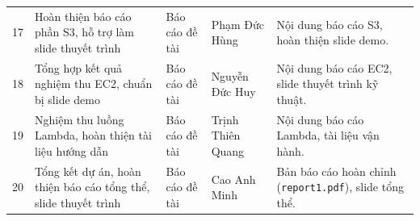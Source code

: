 \documentclass[a4paper,12pt]{article}
\begin{document}
\begin{longtable}{@{}p{0.6cm}>{\raggedright\arraybackslash}p{3.8cm}>{\raggedright\arraybackslash}p{3.2cm}>{\raggedright\arraybackslash}p{2.6cm}>{\raggedright\arraybackslash}p{4.8cm}@{}}
17 & Hoàn thiện báo cáo phần S3, hỗ trợ làm slide thuyết trình & Báo cáo đề tài & Phạm Đức Hùng & Nội dung báo cáo S3, hoàn thiện slide demo.\\
18 & Tổng hợp kết quả nghiệm thu EC2, chuẩn bị slide demo & Báo cáo đề tài & Nguyễn Đức Huy & Nội dung báo cáo EC2, slide thuyết trình kỹ thuật.\\
19 & Nghiệm thu luồng Lambda, hoàn thiện tài liệu hướng dẫn & Báo cáo đề tài & Trịnh Thiên Quang & Nội dung báo cáo Lambda, tài liệu vận hành.\\
20 & Tổng kết dự án, hoàn thiện báo cáo tổng thể, slide thuyết trình & Báo cáo đề tài & Cao Anh Minh & Bản báo cáo hoàn chỉnh (\texttt{report1.pdf}), slide tổng thể.\\
\end{longtable}
\endgroup
\end{document}
